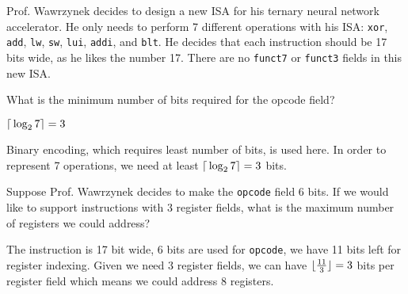\begin{blocksection}
Prof. Wawrzynek decides to design a new ISA for his ternary neural network accelerator. He only needs to perform 7 different operations with his ISA: \lstinline$xor$, \lstinline$add$, \lstinline$lw$, \lstinline$sw$, \lstinline$lui$, \lstinline$addi$, and \lstinline$blt$. He decides that each instruction should be 17 bits wide, as he likes the number 17. There are no \lstinline$funct7$ or \lstinline$funct3$ fields in this new ISA.

\question What is the minimum number of bits required for the opcode field?
\begin{solution}[0.7in]
$\lceil{} \log_2 7 \rceil{} = 3$

Binary encoding, which requires least number of bits, is used here. In order to represent 7 operations, we need at least $\lceil{} \log_2 7 \rceil{} = 3$ bits.
\end{solution}

\question
Suppose Prof. Wawrzynek decides to make the \lstinline$opcode$ field 6 bits. If we would like to support instructions with 3 register fields, what is the maximum number of registers we could address?
\begin{solution}[0.7in]
The instruction is 17 bit wide, 6 bits are used for \lstinline$opcode$, we have 11 bits left for register indexing. Given we need 3 register fields, we can have $\lfloor{} \frac{11}{3} \rfloor{} = 3$ bits per register field which means we could address 8 registers.
\end{solution}

\end{blocksection}